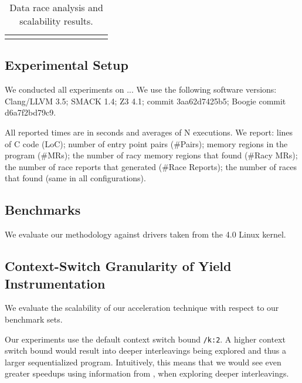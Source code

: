 \newcommand{\colspacing}{\hspace{1.8em}}
\begin{table*}[t]
\small
\centering
\caption{Data race analysis and scalability results.}
\label{tab:races}
\begin{tabular}{l rrr rrr rr r r}
\centering

\end{tabular}
\end{table*}

\subsection{Experimental Setup}
\label{eval:setup}

We conducted all experiments on ... We use the following software versions: Clang/LLVM 3.5; SMACK 1.4; Z3 4.1; \corral commit 3aa62d7425b5; Boogie commit d6a7f2bd79c9.

All reported times are in seconds and averages of N executions. We report: lines of C code (LoC); number of entry point pairs (\#Pairs); memory regions in the program (\#MRs); the number of racy memory regions that \whoop found (\#Racy MRs); the number of race reports that \whoop generated (\#Race Reports); the number of races that \corral found (same in all configurations).

\subsection{Benchmarks}
\label{eval:benchmarks}

We evaluate our methodology against \sizeOfBenchmarks drivers taken from the 4.0 Linux kernel. 

\subsection{Context-Switch Granularity of Yield Instrumentation}
\label{eval:granularity}

We evaluate the scalability of our acceleration technique with respect to our benchmark sets.

Our experiments use the default \corral context switch bound \texttt{/k:2}. A higher context switch bound would result into deeper interleavings being explored and thus a larger sequentialized program. Intuitively, this means that we would see even greater speedups using information from \whoop, when exploring deeper interleavings. 

